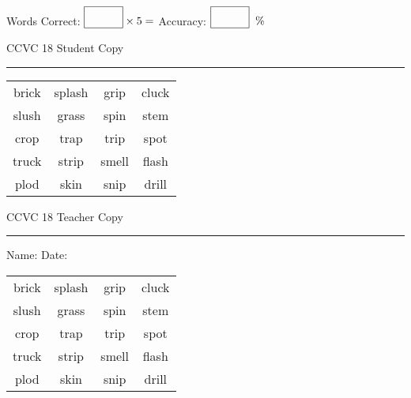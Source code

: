 \documentclass{memoir}
\begin{document}
\small

Words Correct: $\fbox{\phantom{\huge 100}} \times 5 = $ Accuracy: $\fbox{\phantom{\huge 100}}\;\; \%$ 

\vfill

\newpage


\footnotesize \noindent
CCVC 18 \hfill Student Copy
\smallskip
\hrule

\Large

\setlength{\tabcolsep}{14pt}
\def\arraystretch{3}

{\selectfont


\begin{vplace}[0.5]
\begin{center}
\begin{tabular}{cccc}
brick       & splash & grip      & cluck \\
slush & grass                    & spin & stem \\
crop & trap & trip & spot \\
truck & strip & smell & flash             \\
plod & skin & snip & drill \\
\end{tabular}
\end{center}
\end{vplace}

}

\newpage

\footnotesize \noindent
CCVC 18 \hfill Teacher Copy
\smallskip
\hrule

\small

\vfill

\noindent
Name: \underline{\hspace{1.75in}} \hfill Date: \underline{\hspace{1in}}

\Large

{\selectfont


\begin{vplace}[0.5]
\begin{center}
\begin{tabular}{cccc}
brick       & splash & grip      & cluck \\
slush & grass                    & spin & stem \\
crop & trap & trip & spot \\
truck & strip & smell & flash             \\
plod & skin & snip & drill \\
\end{tabular}
\end{center}
\end{vplace}



}
\end{document}
